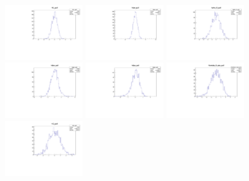 \begin{figure}[tb]
   \begin{center}
	\includegraphics[width=0.3\textwidth]{figs/DataPulls/fL_pull.pdf}
	\includegraphics[width=0.3\textwidth]{figs/DataPulls/fpe_pull.pdf}
	\includegraphics[width=0.3\textwidth]{figs/DataPulls/phis_0_pull.pdf}
	\includegraphics[width=0.3\textwidth]{figs/DataPulls/dpe_pull.pdf}
	\includegraphics[width=0.3\textwidth]{figs/DataPulls/dpa_pull.pdf}
	\includegraphics[width=0.3\textwidth]{figs/DataPulls/lambda_0_abs_pull.pdf}
	\includegraphics[width=0.3\textwidth]{figs/DataPulls/G_pull.pdf}

\end{center}
\end{figure}
